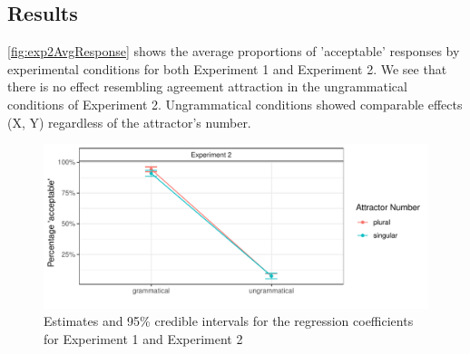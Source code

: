 \documentclass[doc,a4paper,man,natbib,floatsintext,noextraspace]{apa6}\usepackage[]{graphicx}\usepackage[]{color}
\makeatletter
\def\maxwidth{ %
  \ifdim\Gin@nat@width>\linewidth
    \linewidth
  \else
    \Gin@nat@width
  \fi
}
\newenvironment{knitrout}{}{} %
\makeatother
\begin{document}

\subsection{Results} \label{sec:exp2:results}

\autoref{fig:exp2AvgResponse} shows the average proportions of 'acceptable' responses by experimental conditions for both Experiment 1 and Experiment 2. We see that there is no effect resembling agreement attraction in the ungrammatical conditions of Experiment 2. Ungrammatical conditions showed comparable effects (X, Y) regardless of the attractor's number.  

\begin{knitrout}
\color{fgcolor}\begin{figure}

{\centering \includegraphics[width=\maxwidth]{figure/exp2AvgResponse-1} 

}

\caption[Estimates and 95\% credible intervals for the regression coefficients for Experiment 1 and Experiment 2]{Estimates and 95\% credible intervals for the regression coefficients for Experiment 1 and Experiment 2}\label{fig:exp2AvgResponse}
\end{figure}


\end{knitrout}
\end{document}
